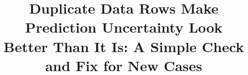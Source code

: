 \documentclass[pdflatex,sn-basic]{sn-jnl}
\theoremstyle{thmstyleone}
\theoremstyle{thmstylethree}
\begin{document}
\title[Repeated rows and conformal coverage for new cases]{Duplicate Data Rows Make Prediction Uncertainty Look Better Than It Is: A Simple Check and Fix for New Cases}

\abstract{}


\maketitle









\backmatter



\end{document}
